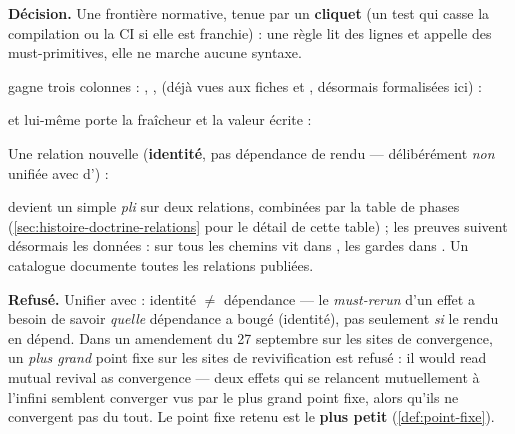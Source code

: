 \textbf{Décision.} Une frontière normative, tenue par un \textbf{cliquet}
(un test qui casse la compilation ou la CI si elle est franchie) : \og une
règle lit des lignes et appelle des must-primitives, elle ne marche aucune
syntaxe\fg{}.


 gagne trois colonnes : , ,
 (déjà vues aux fiches  et , désormais
formalisées ici) :


et  lui-même porte la fraîcheur et la valeur écrite :


Une relation  nouvelle (\textbf{identité}, pas
dépendance de rendu --- délibérément \emph{non} unifiée avec
 d') :


 devient un simple \emph{pli} sur deux relations,
combinées par la table de phases (\cref{sec:histoire-doctrine-relations} pour
le détail de cette table) ; les preuves suivent désormais les données :
\og sur tous les chemins\fg{} vit dans , les gardes
dans . Un catalogue  documente
toutes les relations publiées.

\textbf{Refusé.} Unifier  avec  :
\og identité $\ne$ dépendance\fg{} --- le \emph{must-rerun} d'un effet a besoin
de savoir \emph{quelle} dépendance a bougé (identité), pas seulement
\emph{si} le rendu en dépend. Dans un amendement du 27 septembre sur les
sites de convergence, un \emph{plus grand} point fixe sur les sites de
revivification est refusé : il \og would read mutual revival as
convergence\fg{} --- deux effets qui se relancent mutuellement à l'infini
semblent \og converger\fg{} vus par le plus grand point fixe, alors qu'ils ne
convergent pas du tout. Le point fixe retenu est le \textbf{plus petit}
(\cref{def:point-fixe}).

